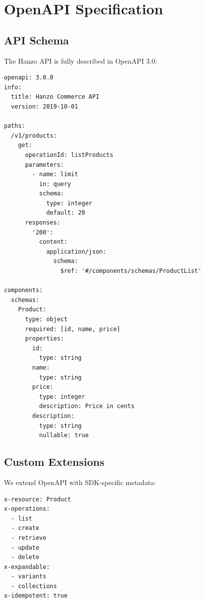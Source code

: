 \section{OpenAPI Specification}


\subsection{API Schema}

The Hanzo API is fully described in OpenAPI 3.0:

\begin{lstlisting}[caption=OpenAPI Schema Excerpt]
openapi: 3.0.0
info:
  title: Hanzo Commerce API
  version: 2019-10-01

paths:
  /v1/products:
    get:
      operationId: listProducts
      parameters:
        - name: limit
          in: query
          schema:
            type: integer
            default: 20
      responses:
        '200':
          content:
            application/json:
              schema:
                $ref: '#/components/schemas/ProductList'

components:
  schemas:
    Product:
      type: object
      required: [id, name, price]
      properties:
        id:
          type: string
        name:
          type: string
        price:
          type: integer
          description: Price in cents
        description:
          type: string
          nullable: true
\end{lstlisting}

\subsection{Custom Extensions}

We extend OpenAPI with SDK-specific metadata:

\begin{lstlisting}[caption=SDK Extensions]
x-resource: Product
x-operations:
  - list
  - create
  - retrieve
  - update
  - delete
x-expandable:
  - variants
  - collections
x-idempotent: true
\end{lstlisting}

